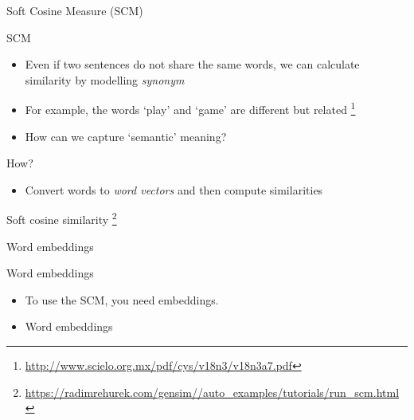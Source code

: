 \documentclass[compress]{beamer}
\begin{document}
\begin{frame}{Soft Cosine Measure (SCM)}
	\begin{block}{SCM}
		\begin{itemize}
			\item <1-> Even if two sentences do not share the same words, we can calculate similarity by modelling \emph{synonym}
			\item <2->For example, the words `play' and `game' are different but related \footnote{\url{http://www.scielo.org.mx/pdf/cys/v18n3/v18n3a7.pdf}}
			\item<3->How can we capture `semantic' meaning?
		\end{itemize}
	\end{block}
	\begin{exampleblock}{How?}
		\begin{itemize}
			\item <4-> Convert words to \emph{word vectors} and then compute similarities 
		\end{itemize}
	\end{exampleblock}
\end{frame}

\begin{frame}
	Soft cosine similarity \footnote{\url{https://radimrehurek.com/gensim//auto_examples/tutorials/run_scm.html}}
\end{frame}

\begin{frame}{Word embeddings}
	\begin{block}{Word embeddings}
		\begin{itemize}
			\item <1->To use the SCM, you need embeddings. 
			\item <2->Word embeddings
		\end{itemize}
	\end{block}
\end{frame}
\end{document}
